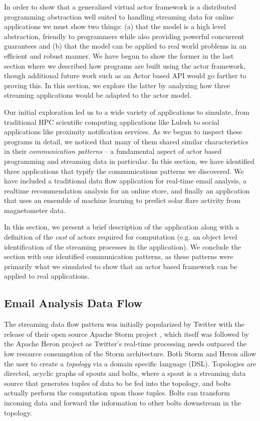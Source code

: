 \documentclass[conference,twocolumn,10pt]{IEEEtran}
\begin{document}
In order to show that a generalized virtual actor framework is a distributed programming abstraction well suited to handling streaming data for online applications we must show two things: (a) that the model is a high level abstraction, friendly to programmers while also providing powerful concurrent guarantees and (b) that the model can be applied to real world problems in an efficient and robust manner. We have begun to show the former in the last section where we described how programs are built using the actor framework, though additional future work such as an Actor based API would go farther to proving this. In this section, we explore the latter by analyzing how three streaming applications would be adapted to the actor model.

Our initial exploration led us to a wide variety of applications to simulate, from traditional HPC scientific computing applications like Lulesh to social applications like proximity notification services. As we begun to inspect these programs in detail, we noticed that many of them shared similar characteristics in their \textit{communication patterns} -- a fundamental aspect of actor based programming and streaming data in particular. In this section, we have identified three applications that typify the communications patterns we discovered. We have included a traditional data flow application for real-time email analysis, a realtime recommendation analysis for an online store, and finally an application that uses an ensemble of machine learning to predict solar flare activity from magnetometer data.

In this section, we present a brief description of the application along with a definition of the \textit{cast} of actors required for computation (e.g. an object level identification of the streaming processes in the application). We conclude the section with our identified communication patterns, as these patterns were primarily what we simulated to show that an actor based framework can be applied to real applications.

\subsection{Email Analysis Data Flow}

The streaming data flow pattern was initially popularized by Twitter with the release of their open source Apache Storm project \cite{toshniwal_storm_2014}, which itself was followed by the Apache Heron project \cite{kulkarni_twitter_2015} as Twitter's real-time processing needs outpaced the low resource consumption of the Storm architecture. Both Storm and Heron allow the user to create a \textit{topology} via a domain specific language (DSL). Topologies are directed, acyclic graphs of spouts and bolts, where a spout is a streaming data source that generates tuples of data to be fed into the topology, and bolts actually perform the computation upon those tuples. Bolts can transform incoming data and forward the information to other bolts downstream in the topology.
\end{document}
